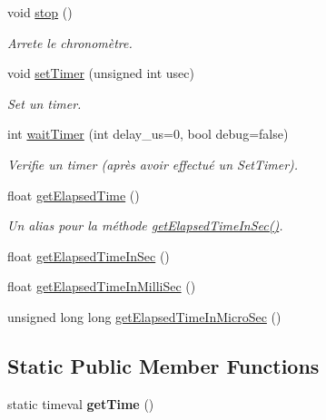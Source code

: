 \begin{DoxyCompactItemize}
\mbox{\label{classutils_1_1Chronometer_ab5884be726059e187292392b76ba63e3}} 
void \hyperlink{classutils_1_1Chronometer_ab5884be726059e187292392b76ba63e3}{stop} ()
\begin{DoxyCompactList}\small\item\em Arrete le chronomètre. \end{DoxyCompactList}\item 
\mbox{\label{classutils_1_1Chronometer_a1dbc0872c71691197c8b4791c6ef3077}} 
void \hyperlink{classutils_1_1Chronometer_a1dbc0872c71691197c8b4791c6ef3077}{set\+Timer} (unsigned int usec)
\begin{DoxyCompactList}\small\item\em Set un timer. \end{DoxyCompactList}\item 
int \hyperlink{classutils_1_1Chronometer_a821bfe0e70f7b50199557667c08dbb67}{wait\+Timer} (int delay\+\_\+us=0, bool debug=false)
\begin{DoxyCompactList}\small\item\em Verifie un timer (après avoir effectué un Set\+Timer). \end{DoxyCompactList}\item 
float \hyperlink{classutils_1_1Chronometer_acf0f4b7283770941a7d3e134160790de}{get\+Elapsed\+Time} ()
\begin{DoxyCompactList}\small\item\em Un alias pour la méthode \hyperlink{classutils_1_1Chronometer_a935aa20dd1791cfc8aec203a8838598d}{get\+Elapsed\+Time\+In\+Sec()}. \end{DoxyCompactList}\item 
float \hyperlink{classutils_1_1Chronometer_a935aa20dd1791cfc8aec203a8838598d}{get\+Elapsed\+Time\+In\+Sec} ()
\item 
float \hyperlink{classutils_1_1Chronometer_aecf9f2e3ced9629be0a03b3ecf0ee01a}{get\+Elapsed\+Time\+In\+Milli\+Sec} ()
\item 
unsigned long long \hyperlink{classutils_1_1Chronometer_a8c641a39ccca4bf655bb09d9c1cd8d9b}{get\+Elapsed\+Time\+In\+Micro\+Sec} ()
\end{DoxyCompactItemize}
\subsection*{Static Public Member Functions}
\begin{DoxyCompactItemize}
\item 
\mbox{\label{classutils_1_1Chronometer_a4f4e58c494682a60b6cc7163ab9206b7}} 
static timeval {\bfseries get\+Time} ()
\end{DoxyCompactItemize}


